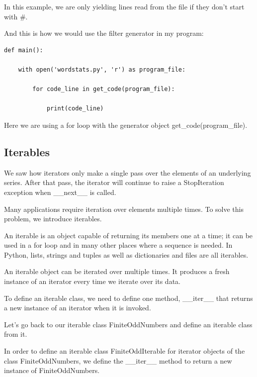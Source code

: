 \documentclass{article}
\begin{document}
In this example, we are only yielding lines read from the file if they don’t start with \#. 

And this is how we would use the filter generator in my program:

\begin{lstlisting}
def main():

    with open('wordstats.py', 'r') as program_file:

        for code_line in get_code(program_file):

            print(code_line)
\end{lstlisting}

Here we are  using a for loop with the generator object get{\_}code(program{\_}file).

\subsection{Iterables}
We saw how iterators only make a single pass over the elements of an underlying series. After that pass, the iterator will continue to raise a StopIteration exception when {\_}{\_}next{\_}{\_} is called. 

Many applications require iteration over elements multiple times.  To solve this problem, we introduce iterables.

An iterable is an object capable of returning its members one at a time; it can be used in a for loop and in many other places where a sequence is needed.   In Python, lists, strings and tuples as well as dictionaries and files are all iterables.

An iterable object can be iterated over multiple times.  It produces a fresh instance of an  iterator every time we iterate over its data.

To define an iterable class, we need to define one method, {\_}{\_}iter{\_}{\_} that returns a new instance of an iterator when it is invoked.

Let’s go back to our iterable class FiniteOddNumbers and define an iterable class from it.

In order to define an iterable class FiniteOddIterable  for iterator objects of the class FiniteOddNumbers, we define the {\_}{\_}iter{\_}{\_} method to return a new instance of FiniteOddNumbers.
\end{document}
